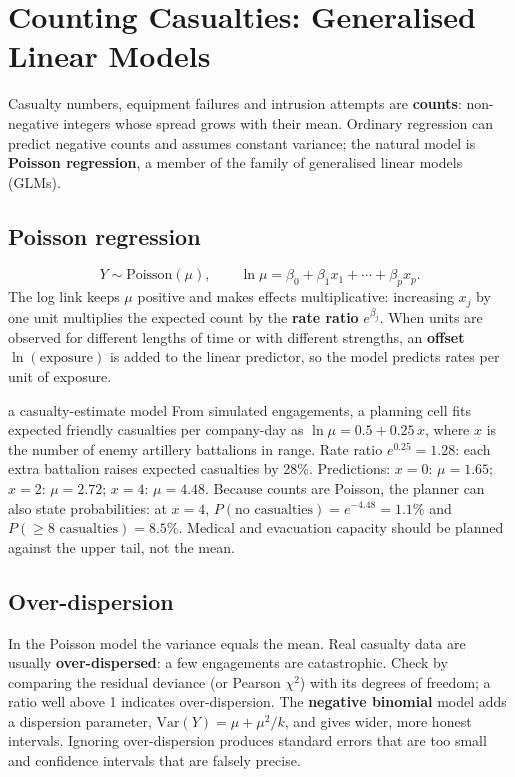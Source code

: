 \documentclass[11pt]{article}
\begin{document}
\section{Counting Casualties: Generalised Linear Models}
Casualty numbers, equipment failures and intrusion attempts are \textbf{counts}: non-negative integers whose spread grows with their mean. Ordinary regression can predict negative counts and assumes constant variance; the natural model is \textbf{Poisson regression}, a member of the family of generalised linear models (GLMs).
\subsection{Poisson regression}
\[Y\sim\text{Poisson}(\mu),\qquad\ln\mu=\beta_0+\beta_1x_1+\cdots+\beta_px_p.\]
The log link keeps $\mu$ positive and makes effects multiplicative: increasing $x_j$ by one unit multiplies the expected count by the \textbf{rate ratio} $e^{\beta_j}$. When units are observed for different lengths of time or with different strengths, an \textbf{offset} $\ln(\text{exposure})$ is added to the linear predictor, so the model predicts rates per unit of exposure.
\begin{example}{a casualty-estimate model}
From simulated engagements, a planning cell fits expected friendly casualties per company-day as $\ln\mu=0.5+0.25\,x$, where $x$ is the number of enemy artillery battalions in range. Rate ratio $e^{0.25}=1.28$: each extra battalion raises expected casualties by 28\%. Predictions: $x=0$: $\mu=1.65$; $x=2$: $\mu=2.72$; $x=4$: $\mu=4.48$. Because counts are Poisson, the planner can also state probabilities: at $x=4$, $P(\text{no casualties})=e^{-4.48}=1.1\%$ and $P(\ge8\text{ casualties})=8.5\%$. Medical and evacuation capacity should be planned against the upper tail, not the mean.
\end{example}
\subsection{Over-dispersion}
In the Poisson model the variance equals the mean. Real casualty data are usually \textbf{over-dispersed}: a few engagements are catastrophic. Check by comparing the residual deviance (or Pearson $\chi^2$) with its degrees of freedom; a ratio well above 1 indicates over-dispersion. The \textbf{negative binomial} model adds a dispersion parameter, $\text{Var}(Y)=\mu+\mu^2/k$, and gives wider, more honest intervals. Ignoring over-dispersion produces standard errors that are too small and confidence intervals that are falsely precise.
\end{document}
